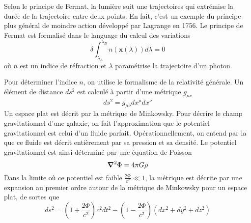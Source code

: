 

Selon le principe de Fermat, la lumière suit une trajectoires qui extrémise
la durée de la trajectoire entre deux points. En fait, c'est un exemple du principe 
plus général de moindre action développé par Lagrange en 1756. 
Le principe de Fermat est formalisé dans le language du calcul 
des variations
\begin{equation}\label{eq:Fermat}
        \delta \int_{\lambda_A}^{\lambda_B} n(\mathbf{x}(\lambda))d\lambda = 0 
\end{equation} 
où $n$ est un indice de réfraction et $\lambda$ paramétrise la trajectoire d'un photon. 

Pour déterminer l'indice $n$, on utilise le formalisme de la relativité 
générale. Un élément de distance $ds^2$ est calculé à partir d'une métrique $g_{\mu \nu}$ 
\begin{equation}\label{eq:ds}
        ds^2 = g_{\mu \nu}dx^{\mu}dx^{\nu}
\end{equation} 
Un espace plat est décrit par la métrique de Minkowsky. Pour décrire le champ 
gravitationnel d'une galaxie, on fait l'approximation que le potentiel gravitationnel 
est celui d'un fluide parfait. Opérationnellement, on entend par la que ce fluide est décrit entièrement 
par sa pression et sa densité. Le potentiel gravitationnel est ainsi déterminé 
par une équation de Poisson 
\begin{equation}\label{eq:Poisson}
       \grad^{2}\Phi = 4\pi G \rho 
\end{equation} 
Dans la limite où ce potentiel est faible $\displaystyle \frac{2\Phi}{c^{2}} \ll 1$, la 
métrique est décrite par une expansion au premier ordre autour de la 
métrique de Minkowsky pour un espace plat, de sortes que
\begin{equation}\label{eq:newton}
        ds^2 = \left( 1 + \frac{2\Phi}{c^{2}} \right)c^{2}dt^{2} - \left( 1 - \frac{2\Phi}{c^{2}} \right)(dx^{2} + dy^{2} + dz^{2})
\end{equation} 

